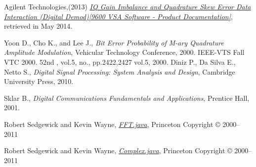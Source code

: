 \documentclass[12pt,a4paper,openright]{report}
\begin{document}
\begin{thebibliography}{1}
Agilent Technologies,(2013) \href{http://wireless.agilent.com/wireless/helpfiles/89600B/WebHelp/subsystems/digdemod/content/digdemod_para_interact_iqgainimb_quadskewerr.htm}{\emph{IQ Gain Imbalance and Quadrature Skew Error Data Interaction (Digital Demod)[9600 VSA Software - Product Documentation]}}, retrieved in May 2014.

Yoon D., Cho K., and Lee J., \emph{Bit Error Probability of M-ary Quadrature Amplitude Modulation}, Vehicular Technology Conference, 2000. IEEE-VTS Fall VTC 2000. 52nd , vol.5, no., pp.2422,2427 vol.5, 2000.
Diniz P., Da Silva E., Netto S., \emph{Digital Signal Processing: System Analysis and Design}, Cambridge University Press, 2010.

Sklar B., \emph{Digital Communications Fundamentals and Applications}, Prentice Hall, 2001.


Robert Sedgewick and Kevin Wayne,
\href{http://introcs.cs.princeton.edu/java/97data/FFT.java.html}{\emph{FFT.java}},  Princeton
Copyright © 2000–2011

Robert Sedgewick and Kevin Wayne,
\href{http://introcs.cs.princeton.edu/java/97data/Complex.java.html}{\emph{Complex.java}},  Princeton
Copyright © 2000–2011






\end{thebibliography}
\end{document}
